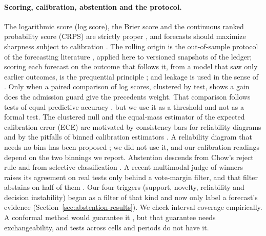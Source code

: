 \paragraph{Scoring, calibration, abstention and the protocol.}
The logarithmic score (log score), the Brier score and the continuous ranked probability score (CRPS) are strictly proper \cite{gneiting2007strictly,matheson1976scoring}, and forecasts should maximize sharpness subject to calibration \cite{gneiting2007probabilistic}. The rolling origin is the out-of-sample protocol of the forecasting literature \cite{tashman2000outofsample}, applied here to versioned snapshots of the ledger; scoring each forecast on the outcome that follows it, from a model that saw only earlier outcomes, is the prequential principle \cite{dawid1984prequential}; and leakage is used in the sense of \cite{kaufman2012leakage}. Only when a paired comparison of log scores, clustered by test, shows a gain does the admission guard give the precedents weight. That comparison follows tests of equal predictive accuracy \cite{diebold1995comparing,giacomini2006tests}, but we use it as a threshold and not as a formal test. The clustered null and the equal-mass estimator of the expected calibration error (ECE) are motivated by consistency bars for reliability diagrams \cite{brocker2007increasing} and by the pitfalls of binned calibration estimators \cite{vaicenavicius2019evaluating}. A reliability diagram that needs no bins has been proposed \cite{dimitriadis2021stable}; we did not use it, and our calibration readings depend on the two binnings we report. Abstention descends from Chow's reject rule \cite{chow1970optimum} and from selective classification \cite{geifman2017selective}. A recent multimodal judge of winners raises its agreement on real tests only behind a vote-margin filter, and that filter abstains on half of them \cite{dooskin2026judge}. Our four triggers (support, novelty, reliability and decision instability) began as a filter of that kind and now only label a forecast's evidence (Section~\ref{sec:abstention-results}). We check interval coverage empirically. A conformal method would guarantee it \cite{vovk2005algorithmic,angelopoulos2021gentle}, but that guarantee needs exchangeability, and tests across cells and periods do not have it.

